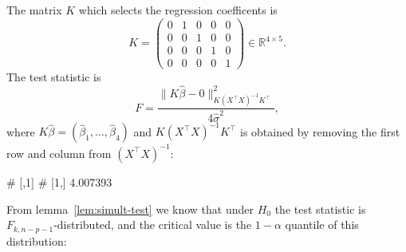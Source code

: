 \documentclass[
  a4paper,
]{article}
\newenvironment{Shaded}{\begin{snugshade}}{\end{snugshade}}
\newcommand{\DecValTok}[1]{\textcolor[rgb]{0.00,0.00,0.81}{#1}}
\newcommand{\FunctionTok}[1]{\textcolor[rgb]{0.13,0.29,0.53}{\textbf{#1}}}
\newcommand{\NormalTok}[1]{#1}
\newcommand{\OtherTok}[1]{\textcolor[rgb]{0.56,0.35,0.01}{#1}}
\newcommand{\SpecialCharTok}[1]{\textcolor[rgb]{0.81,0.36,0.00}{\textbf{#1}}}
\theoremstyle{definition}
\theoremstyle{definition}
\theoremstyle{definition}
\theoremstyle{definition}
\theoremstyle{remark}
\begin{document}
The matrix \(K\) which selects the regression coefficents
is
\begin{equation*}
  K
  = \begin{pmatrix}
    0 & 1 & 0 & 0 & 0 \\
    0 & 0 & 1 & 0 & 0 \\
    0 & 0 & 0 & 1 & 0 \\
    0 & 0 & 0 & 0 & 1
  \end{pmatrix}
  \in \mathbb{R}^{4\times 5}.
\end{equation*}
The test statistic is
\begin{equation*}
  F
  = \frac{\bigl\| K \hat\beta - 0 \bigr\|_{K(X^\top X)^{-1} K^\top}^2}
          {4 \hat\sigma^2},
\end{equation*}
where \(K \hat\beta = (\hat\beta_1, \ldots, \hat\beta_4)\)
and \(K(X^\top X)^{-1} K^\top\) is obtained by removing the first row and
column from \((X^\top X)^{-1}\):

\begin{Shaded}
\end{Shaded}

\begin{Shaded}
\begin{Highlighting}[]
\NormalTok{\#          [,1]}
\NormalTok{\# [1,] 4.007393}
\end{Highlighting}
\end{Shaded}

From lemma~\ref{lem:simult-test} we know that under \(H_0\)
the test statistic is \(F_{k, n-p-1}\)-distributed, and the
critical value is the \(1-\alpha\) quantile of this distribution:
\end{document}
